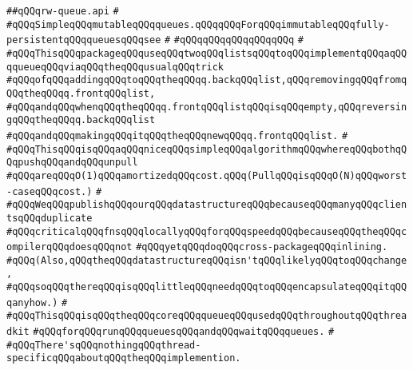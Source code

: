 \label{src/lib/src/rw-queue.api}
\verb|##qQQqrw-queue.api|\newline
\verb|#|\newline
\verb|#qQQqSimpleqQQqmutableqQQqqueues.qQQqqQQqForqQQqimmutableqQQqfully-persistentqQQqqueuesqQQqsee|\newline
\verb|#|\newline
\verb|#qQQqqQQqqQQqqQQqqQQq|\newline
\verb|#|\newline
\verb|#qQQqThisqQQqpackageqQQquseqQQqtwoqQQqlistsqQQqtoqQQqimplementqQQqaqQQqqueueqQQqviaqQQqtheqQQqusualqQQqtrick|\newline
\verb|#qQQqofqQQqaddingqQQqtoqQQqtheqQQqq.backqQQqlist,qQQqremovingqQQqfromqQQqtheqQQqq.frontqQQqlist,|\newline
\verb|#qQQqandqQQqwhenqQQqtheqQQqq.frontqQQqlistqQQqisqQQqempty,qQQqreversingqQQqtheqQQqq.backqQQqlist|\newline
\verb|#qQQqandqQQqmakingqQQqitqQQqtheqQQqnewqQQqq.frontqQQqlist.|\newline
\verb|#|\newline
\verb|#qQQqThisqQQqisqQQqaqQQqniceqQQqsimpleqQQqalgorithmqQQqwhereqQQqbothqQQqpushqQQqandqQQqunpull|\newline
\verb|#qQQqareqQQqO(1)qQQqamortizedqQQqcost.qQQq(PullqQQqisqQQqO(N)qQQqworst-caseqQQqcost.)|\newline
\verb|#|\newline
\verb|#qQQqWeqQQqpublishqQQqourqQQqdatastructureqQQqbecauseqQQqmanyqQQqclientsqQQqduplicate|\newline
\verb|#qQQqcriticalqQQqfnsqQQqlocallyqQQqforqQQqspeedqQQqbecauseqQQqtheqQQqcompilerqQQqdoesqQQqnot|\newline
\verb|#qQQqyetqQQqdoqQQqcross-packageqQQqinlining.|\newline
\verb|#qQQq(Also,qQQqtheqQQqdatastructureqQQqisn'tqQQqlikelyqQQqtoqQQqchange,|\newline
\verb|#qQQqsoqQQqthereqQQqisqQQqlittleqQQqneedqQQqtoqQQqencapsulateqQQqitqQQqanyhow.)|\newline
\verb|#|\newline
\verb|#qQQqThisqQQqisqQQqtheqQQqcoreqQQqqueueqQQqusedqQQqthroughoutqQQqthreadkit|\newline
\verb|#qQQqforqQQqrunqQQqqueuesqQQqandqQQqwaitqQQqqueues.|\newline
\verb|#|\newline
\verb|#qQQqThere'sqQQqnothingqQQqthread-specificqQQqaboutqQQqtheqQQqimplemention.|\newline
